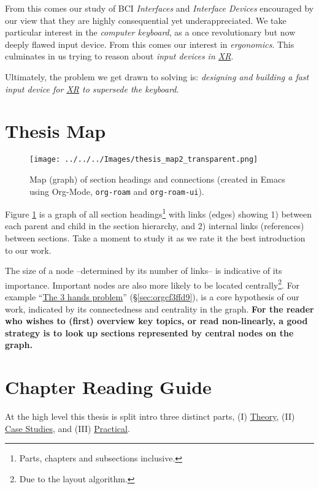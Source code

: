 \documentclass[logo,bsc,singlespacing,parskip]{infthesis}
\begin{document}
From this comes our study of BCI \emph{Interfaces} and \emph{Interface Devices} encouraged by our view that they are highly consequential yet underappreciated.
We take particular interest in the \emph{computer keyboard}, as a once revolutionary but now deeply flawed input device.
From this comes our interest in \emph{ergonomics}.
This culminates in us trying to reason about \emph{input devices in \hyperref[org88b0f70]{XR}}.

Ultimately, the problem we get drawn to solving is: \emph{designing and building a fast input device for \hyperref[org88b0f70]{XR} to supersede the keyboard}.
\chapter*{Thesis Map}
\label{sec:org26c6bf9}

\begin{figure}[H]
\centering
\texttt{[image: ../../../Images/thesis\_map2\_transparent.png]}
\caption[Thesis map]{\label{fig:topic_map}Map (graph) of section headings and connections (created in Emacs using Org-Mode, \texttt{org-roam} and \texttt{org-roam-ui}).}
\end{figure}

Figure \ref{fig:topic_map} is a graph of all section headings\footnote{Parts, chapters and subsections inclusive.} with links (edges) showing 1) between each parent and child in the section hierarchy, and 2) internal links (references) between sections.
Take a moment to study it as we rate it the best introduction to our work.

The size of a node --determined by its number of links-- is indicative of its importance.
Important nodes are also more likely to be located centrally\footnote{Due to the layout algorithm.}.
For example ``\hyperref[sec:orgcf3ffd9]{The 3 hands problem}'' (\S \ref{sec:orgcf3ffd9}), is a core hypothesis of our work, indicated by its connectedness and centrality in the graph.
\textbf{For the reader who wishes to (first) overview key topics, or read non-linearly, a good strategy is to look up sections represented by central nodes on the graph.}

\chapter*{Chapter Reading Guide}
\label{sec:org0917194}
At the high level this thesis is split intro three distinct parts, (I) \hyperref[sec:orge2668b0]{Theory}, (II) \hyperref[sec:org8c5f1d6]{Case Studies}, and (III) \hyperref[sec:orgf66b89e]{Practical}.
\end{document}
